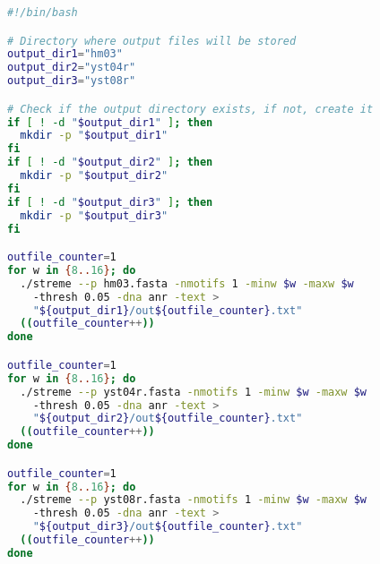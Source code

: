 \begin{lstlisting}[language=bash]
#!/bin/bash

# Directory where output files will be stored
output_dir1="hm03"
output_dir2="yst04r"
output_dir3="yst08r"

# Check if the output directory exists, if not, create it
if [ ! -d "$output_dir1" ]; then
  mkdir -p "$output_dir1"
fi
if [ ! -d "$output_dir2" ]; then
  mkdir -p "$output_dir2"
fi
if [ ! -d "$output_dir3" ]; then
  mkdir -p "$output_dir3"
fi

outfile_counter=1
for w in {8..16}; do
  ./streme --p hm03.fasta -nmotifs 1 -minw $w -maxw $w
    -thresh 0.05 -dna anr -text >
	"${output_dir1}/out${outfile_counter}.txt"
  ((outfile_counter++))
done

outfile_counter=1
for w in {8..16}; do
  ./streme --p yst04r.fasta -nmotifs 1 -minw $w -maxw $w
    -thresh 0.05 -dna anr -text >
    "${output_dir2}/out${outfile_counter}.txt"
  ((outfile_counter++))
done

outfile_counter=1
for w in {8..16}; do
  ./streme --p yst08r.fasta -nmotifs 1 -minw $w -maxw $w
    -thresh 0.05 -dna anr -text >
    "${output_dir3}/out${outfile_counter}.txt"
  ((outfile_counter++))
done


\end{lstlisting}